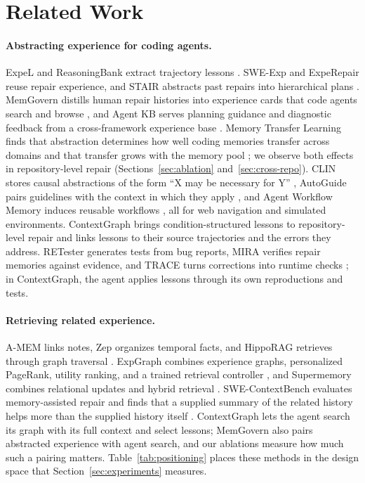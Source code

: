 \section{Related Work}
\label{sec:related-work}

\paragraph{Abstracting experience for coding agents.}
ExpeL and ReasoningBank extract trajectory lessons
\citep{expel2024,reasoningbank2026}. SWE-Exp and ExpeRepair reuse repair
experience, and STAIR abstracts past repairs into hierarchical plans
\citep{sweexp2025,experepair2026,stair2026}. MemGovern distills human
repair histories into experience cards that code agents search and browse
\citep{memgovern2026}, and Agent KB serves planning guidance and diagnostic
feedback from a cross-framework experience base \citep{agentkb2025}.
Memory Transfer Learning finds that abstraction determines how well coding
memories transfer across domains and that transfer grows with the memory pool
\citep{transfer2026}; we observe both effects in repository-level repair
(Sections~\ref{sec:ablation} and~\ref{sec:cross-repo}).
CLIN stores causal abstractions of the form ``X may be necessary for Y''
\citep{clin2023}, AutoGuide pairs guidelines with the context in which they
apply \citep{autoguide2024}, and Agent Workflow Memory induces reusable
workflows \citep{awm2025}, all for web navigation and simulated environments.
ContextGraph brings condition-structured lessons to repository-level repair
and links lessons to their source trajectories and the errors they address.
RETester generates tests from bug reports, MIRA verifies repair memories
against evidence, and TRACE turns corrections into runtime checks
\citep{retester2025,mira2026,trace2026}; in ContextGraph, the agent applies
lessons through its own reproductions and tests.

\paragraph{Retrieving related experience.}
A-MEM links notes, Zep organizes temporal facts, and HippoRAG retrieves through
graph traversal \citep{amem2025,zep2025,hipporag2024}. ExpGraph combines
experience graphs, personalized PageRank, utility ranking, and a trained
retrieval controller \citep{expgraph2026}, and Supermemory combines relational
updates and hybrid retrieval \citep{supermemoryreport2026}. SWE-ContextBench
evaluates memory-assisted repair and finds that a supplied summary of the
related history helps more than the supplied history itself
\citep{swecontext2026}.
ContextGraph lets the agent search its graph with its full context and select
lessons; MemGovern also pairs abstracted experience with agent search, and our
ablations measure how much such a pairing matters. Table~\ref{tab:positioning}
places these methods in the design space that Section~\ref{sec:experiments}
measures.

